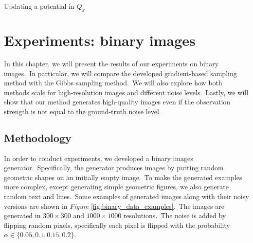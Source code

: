 \documentclass[shortabstract, english, lic]{iithesis}
\newcommand\numberedchapter[1]{\setlength\topskip{3cm}\chapter{#1}\setlength\topskip{0cm}}
\theoremstyle{default_theorem_style}\newtheorem{theorem}{Theorem}
\theoremstyle{default_theorem_style}\newtheorem{definition}{Definition}
\begin{document}
\begin{algorithm}[H]
\caption{Updating a potential in $Q_x$}\label{alg:updating_q}
\begin{algorithmic}[1]
\EndIf
{}
\end{algorithmic}
\end{algorithm}

\numberedchapter{Experiments: binary images} \label{chapter:experiments}

In this chapter, we will present the results of our experiments on binary images.\ In particular, we will compare
the developed gradient-based sampling method with the Gibbs sampling method.\ We will also explore how both methods
scale for high-resolution images and different noise levels.\ Lastly, we will show that our method
generates high-quality images even if the observation strength is not equal to the ground-truth noise level.

\section{Methodology}

In order to conduct experiments, we developed a binary images generator.\ Specifically, the generator produces
images by putting random geometric shapes on an initially empty image.\ To make the generated examples more complex,
except generating simple geometric figures, we also generate random text and lines.\ Some examples of
generated images along with their noisy versions are shown in \textit{Figure}
\ref{fig:binary_data_examples}.\ The images are generated in $300{\times}300$ and $1000{\times}1000$
resolutions.\ The noise is added by flipping random pixels, specifically each pixel is flipped with the probability
$\tilde{\alpha} \in \{0.05, 0.1, 0.15, 0.2\}$.\newline
\end{document}
